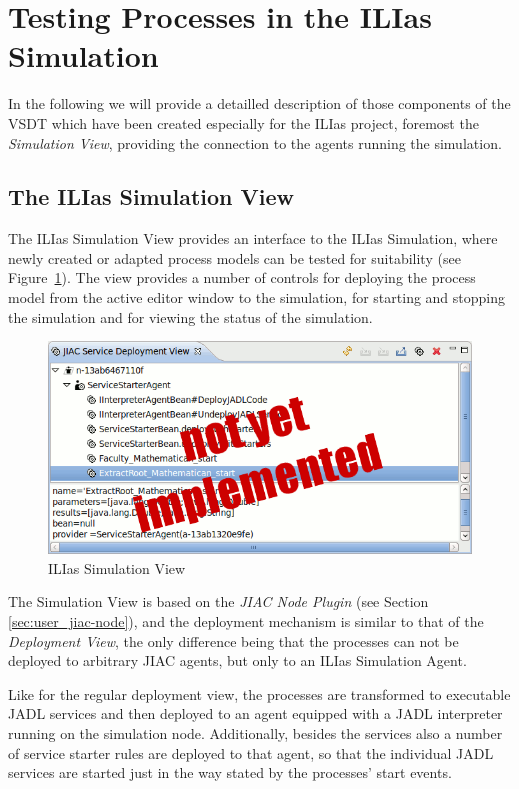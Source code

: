 \section{Testing Processes in the ILIas Simulation}

In the following we will provide a detailled description of those components of
the VSDT which have been created especially for the ILIas project, foremost the
\emph{Simulation View}, providing the connection to the agents running the
simulation.


\subsection{The ILIas Simulation View}

The ILIas Simulation View provides an interface to the ILIas Simulation, where
newly created or adapted process models can be tested for suitability (see
Figure~\ref{fig:ilias-simview}).  The view provides a number of controls for
deploying the process model from the active editor window to the simulation, for
starting and stopping the simulation and for viewing the status of the simulation.

\begin{figure}[ht]
	\centering
	\includegraphics[width=.6\textwidth]{ilias/simulation-view_nyi.png}
	\caption{ILIas Simulation View}
	\label{fig:ilias-simview}
\end{figure}

The Simulation View is based on the \emph{JIAC Node Plugin} (see Section
\ref{sec:user_jiac-node}), and the deployment mechanism is similar to that of the
\emph{Deployment View}, the only difference being that the processes can not be
deployed to arbitrary JIAC agents, but only to an ILIas Simulation Agent.

Like for the regular deployment view, the processes are transformed to executable
JADL services and then deployed to an agent equipped with a JADL interpreter
running on the simulation node.  Additionally, besides the services also a number of
service starter rules are deployed to that agent, so that the individual JADL
services are started just in the way stated by the processes' start events.


